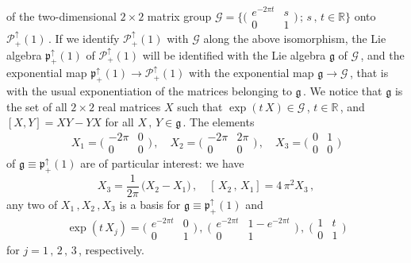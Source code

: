 \documentclass[reqno]{amsart}
\theoremstyle{definition}
\theoremstyle{remark}
\numberwithin{equation}{section}
\theoremstyle{plain}
\begin{document}
of the two-dimensional $2\times 2$ matrix group
$\displaystyle
\mathcal G =\Big\{ \Big( \begin{array}{cc} e^{-2\pi t} & s\\
0 & 1\end{array}\Big)\, ;\, s\, ,\, t\in\mathbb R\Big\}$ onto
$\mathcal P_+^\uparrow (1)\,$. If we identify
$\mathcal P_+^\uparrow (1)$ with $\mathcal G$ along the above
isomorphism, the Lie algebra
$\mathfrak p_+^\uparrow (1)$ of $\mathcal P_+^\uparrow (1)$ will
be identified with the Lie algebra $\mathfrak g$ of $\mathcal G\,$,
and the exponential map $\mathfrak p_+^\uparrow (1)\longrightarrow
\mathcal P_+^\uparrow (1)$ with the exponential map
$\mathfrak g\longrightarrow\mathcal G\,$, that is with the usual
exponentiation of the matrices belonging to $\mathfrak g\,$.
We notice that $\mathfrak g$ is the set of all $2\times 2$ real
matrices $X$ such that $\exp (t\, X)\in\mathcal G\,$,
$t\in\mathbb R\,$, and $[X,Y]=X Y-Y X$ for all $X\, ,\, Y\in
\mathfrak g\,$. The elements
\begin{equation}\label{gener}
X_1=\Big( \begin{array}{cc} -2\pi & 0\\ 0 & 0\end{array}\Big)\, ,
\quad X_2=\Big( \begin{array}{cc} -2\pi & 2\pi\\ 0 & 0\end{array}
\Big)\, ,\quad X_3=\Big( \begin{array}{cc} 0 & 1\\ 0 & 0\end{array}
\Big)
\end{equation}
of $\mathfrak g\equiv\mathfrak p_+^\uparrow (1)$ are of particular
interest: we have
\begin{equation}\label{commutation}
X_3=\frac 1{2\pi}\,\big( X_2 -X_1\big)\, ,\quad [\, X_2\, ,\, X_1]=
4\,\pi^2 X_3\, ,
\end{equation}
any two of $X_1\, ,X_2\, ,X_3$ is a basis for $\mathfrak g\equiv
\mathfrak p_+^\uparrow (1)$ and
\begin{equation}\label{gen.exp}
\exp (t\, X_j) =
\Big( \begin{array}{cc} e^{-2\pi t} & 0\\ 0 & 1
\end{array}\Big)\, ,\;\Big( \begin{array}{cc}
e^{-2\pi t} & 1-e^{-2\pi t}\\ 0 & 1\end{array}\Big)\, ,\;
\Big( \begin{array}{cc}1 & t\\ 0 & 1\end{array}\Big)
\end{equation}
for $j=1\, ,\, 2\, ,\, 3\,$, respectively.
\end{document}
